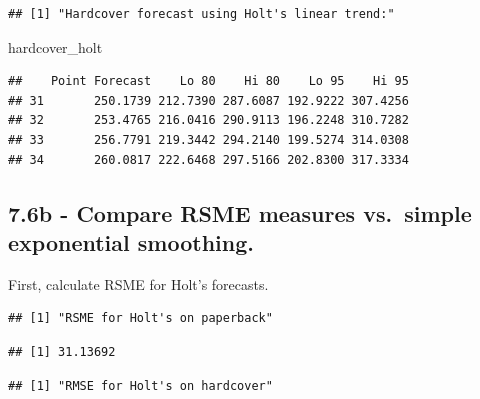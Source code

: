 \documentclass[]{book}
\newenvironment{Shaded}{\begin{snugshade}}{\end{snugshade}}
\newcommand{\KeywordTok}[1]{\textcolor[rgb]{0.13,0.29,0.53}{\textbf{#1}}}
\newcommand{\NormalTok}[1]{#1}
\newcommand{\OperatorTok}[1]{\textcolor[rgb]{0.81,0.36,0.00}{\textbf{#1}}}
\begin{document}
\begin{verbatim}
## [1] "Hardcover forecast using Holt's linear trend:"
\end{verbatim}

\begin{Shaded}
\begin{Highlighting}[]
\NormalTok{hardcover_holt}
\end{Highlighting}
\end{Shaded}

\begin{verbatim}
##    Point Forecast    Lo 80    Hi 80    Lo 95    Hi 95
## 31       250.1739 212.7390 287.6087 192.9222 307.4256
## 32       253.4765 216.0416 290.9113 196.2248 310.7282
## 33       256.7791 219.3442 294.2140 199.5274 314.0308
## 34       260.0817 222.6468 297.5166 202.8300 317.3334
\end{verbatim}

\hypertarget{b---compare-rsme-measures-vs.-simple-exponential-smoothing.}{%
\subsection{7.6b - Compare RSME measures vs.~simple exponential smoothing.}\label{b---compare-rsme-measures-vs.-simple-exponential-smoothing.}}

First, calculate RSME for Holt's forecasts.

\begin{verbatim}
## [1] "RSME for Holt's on paperback"
\end{verbatim}

\begin{Shaded}
\end{Shaded}

\begin{verbatim}
## [1] 31.13692
\end{verbatim}

\begin{verbatim}
## [1] "RMSE for Holt's on hardcover"
\end{verbatim}

\begin{Shaded}
\end{Shaded}
\end{document}
